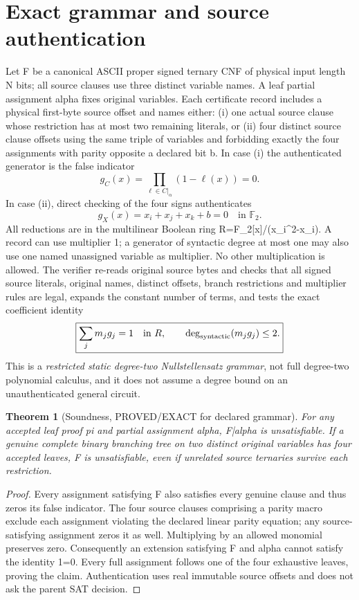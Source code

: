 \documentclass[11pt]{article}
\newtheorem{theorem}{Theorem}
\newcommand{\F}{\mathbb F_2}
\begin{document}
\section{Exact grammar and source authentication}
Let F be a canonical ASCII proper signed ternary CNF of physical input length N bits; all source clauses use three distinct variable names. A leaf partial assignment alpha fixes original variables. Each certificate record includes a physical first-byte source offset and names either: (i) one actual source clause whose restriction has at most two remaining literals, or (ii) four distinct source clause offsets using the same triple of variables and forbidding exactly the four assignments with parity opposite a declared bit b. In case (i) the authenticated generator is the false indicator
\[
g_C(x)=\prod_{\ell\in C|_\alpha}(1-\ell(x))=0.
\]
In case (ii), direct checking of the four signs authenticates
\[
g_X(x)=x_i+x_j+x_k+b=0\quad\text{in }\F.
\]
All reductions are in the multilinear Boolean ring R=F_2[x]/(x_i^2-x_i). A record can use multiplier 1; a generator of syntactic degree at most one may also use one named unassigned variable as multiplier. No other multiplication is allowed. The verifier re-reads original source bytes and checks that all signed source literals, original names, distinct offsets, branch restrictions and multiplier rules are legal, expands the constant number of terms, and tests the exact coefficient identity
\[
\boxed{\sum_j m_j g_j=1\quad\text{in }R,\qquad\deg_{\rm syntactic}(m_jg_j)\le2.}
\]
This is a \emph{restricted static degree-two Nullstellensatz grammar}, not full degree-two polynomial calculus, and it does not assume a degree bound on an unauthenticated general circuit.

\begin{theorem}[Soundness, PROVED/EXACT for declared grammar]
For any accepted leaf proof pi and partial assignment alpha, F|alpha is unsatisfiable. If a genuine complete binary branching tree on two distinct original variables has four accepted leaves, F is unsatisfiable, even if unrelated source ternaries survive each restriction.
\end{theorem}
\begin{proof}
Every assignment satisfying F also satisfies every genuine clause and thus zeros its false indicator. The four source clauses comprising a parity macro exclude each assignment violating the declared linear parity equation; any source-satisfying assignment zeros it as well. Multiplying by an allowed monomial preserves zero. Consequently an extension satisfying F and alpha cannot satisfy the identity 1=0. Every full assignment follows one of the four exhaustive leaves, proving the claim. Authentication uses real immutable source offsets and does not ask the parent SAT decision.
\end{proof}
\end{document}
